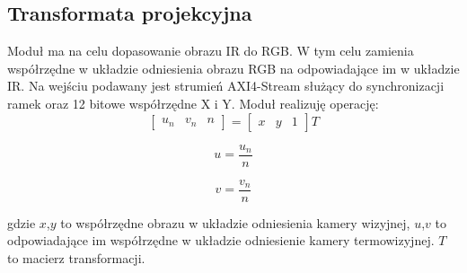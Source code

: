 \subsection {Transformata projekcyjna}
Moduł ma na celu dopasowanie obrazu IR do RGB. W tym celu zamienia współrzędne w układzie odniesienia obrazu RGB na odpowiadające im w układzie IR.
Na wejściu podawany jest strumień AXI4-Stream służący do synchronizacji ramek oraz 12 bitowe współrzędne X i Y. %
Moduł realizuję operację: 
\begin{equation}
\begin{bmatrix}
u_n & v_n & n
\end{bmatrix} 
= 
\begin{bmatrix}
x & y & 1
\end{bmatrix}
T
\end{equation}

\begin{equation}
u = \frac{u_n}{n}
\end{equation}

\begin{equation}
v = \frac{v_n}{n}
\end{equation}

\noindent
 gdzie $x$,$y$ to współrzędne obrazu w układzie odniesienia kamery wizyjnej, $u$,$v$ to odpowiadające im współrzędne w układzie odniesienie kamery termowizyjnej. $T$ to macierz transformacji.

